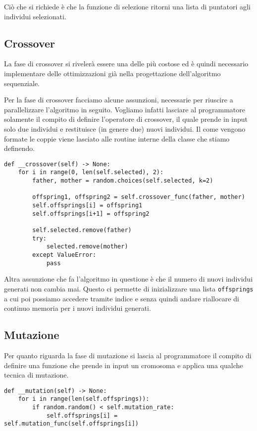 Ciò che si richiede è che la funzione di selezione ritorni una lista di
puntatori agli individui selezionati.

\subsection{Crossover}

La fase di crossover si rivelerà essere una delle più costose ed è quindi
necessario implementare delle ottimizzazioni già nella progettazione
dell'algoritmo sequenziale.

Per la fase di crossover facciamo alcune assunzioni, necessarie per riuscire
a parallelizzare l'algoritmo in seguito. Vogliamo infatti lasciare al
programmatore solamente il compito di definire l'operatore di crossover, il
quale prende in input solo due individui e restituisce (in genere due) nuovi
individui. Il come vengono formate le coppie viene lasciato alle routine
interne della classe che stiamo definendo.

\begin{verbatim}
def __crossover(self) -> None:
	for i in range(0, len(self.selected), 2):
		father, mother = random.choices(self.selected, k=2)

		offspring1, offspring2 = self.crossover_func(father, mother)
		self.offsprings[i] = offspring1
		self.offsprings[i+1] = offspring2

		self.selected.remove(father)
		try:
			selected.remove(mother)
		except ValueError:
			pass
\end{verbatim}

Altra assunzione che fa l'algoritmo in questione è che il numero di nuovi
individui generati non cambia mai. Questo ci permette di inizializzare una
lista \verb|offsprings| a cui poi possiamo accedere tramite indice e senza
quindi andare riallocare di continuo memoria per i nuovi individui generati.

\subsection{Mutazione}

Per quanto riguarda la fase di mutazione si lascia al programmatore il compito
di definire una funzione che prende in input un cromosoma e applica una qualche
tecnica di mutazione.

\begin{verbatim}
def __mutation(self) -> None:
	for i in range(len(self.offsprings)):
		if random.random() < self.mutation_rate:
			self.offsprings[i] = self.mutation_func(self.offsprings[i])
\end{verbatim}

